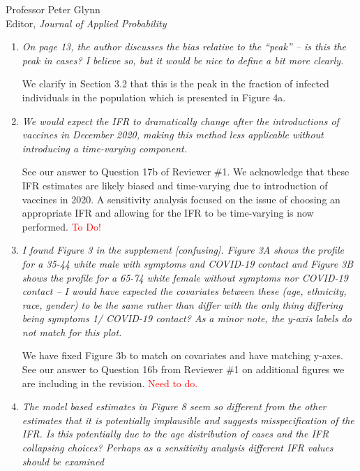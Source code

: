 \documentclass[11pt]{letter} %
\begin{document}
\begin{letter}{Professor
	Peter Glynn\\
	Editor, {\em Journal of Applied Probability}}
\begin{enumerate}
\vspace{5mm}
We apologize for the confusion.  See answer to Question 3b where we clarify the definition of active infection.  An active infection was meant to refer to individuals who were infected with SARS-CoV-2 who have yet to fall below a threshold for detectable viral load levels by RT-PCR testing.  This includes the infectious period as well as a pre-infectious and post-infectious periods of time.

\vspace{5mm}
\item {\it On page 13, the author discusses the bias relative to the “peak” – is this the peak in cases? I believe so, but it would be nice to define a bit more clearly.}

\vspace{5mm}
We clarify in Section 3.2 that this is the peak in the fraction of infected individuals in the population which is presented in Figure 4a.
\vspace{5mm}
\item {\it We would expect the IFR to dramatically change after the introductions of vaccines in December 2020, making this method less applicable without introducing a time-varying component.}

\vspace{5mm}
See our answer to Question 17b of Reviewer \#1. We acknowledge that these IFR estimates are likely biased and time-varying due to introduction of vaccines in 2020.  A sensitivity analysis focused on the issue of choosing an appropriate IFR and allowing for the IFR to be time-varying is now performed.
\textcolor{red}{To Do!}

\vspace{5mm}
\item {\it I found Figure 3 in the supplement [confusing]. Figure 3A shows the profile for a 35-44 white male with symptoms and COVID-19 contact and Figure 3B shows the profile for a 65-74 white female without symptoms nor COVID-19 contact – I would have expected the covariates between these (age, ethnicity, race, gender) to be the same rather than differ with the only thing differing being symptoms 1/ COVID-19 contact? As a minor note, the y-axis labels do not match for this plot.}

\vspace{5mm}
We have fixed Figure 3b to match on covariates and have matching y-axes.  See our answer to Question 16b from Reviewer \#1 on additional figures we are including in the revision.
\textcolor{red}{Need to do.}
\vspace{5mm}
\item {\it The model based estimates in Figure 8 seem so different from the other estimates that it is potentially implausible and suggests misspecification of the IFR. Is this potentially due to the age distribution of cases and the IFR collapsing choices? Perhaps as a sensitivity analysis different IFR values should be examined}


\end{enumerate}
\end{letter}
\end{document}
